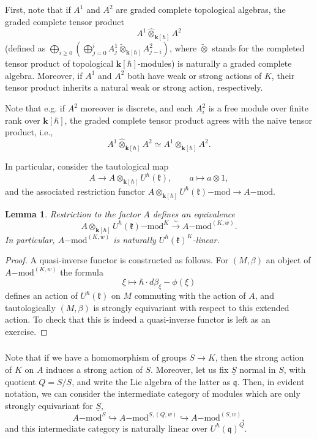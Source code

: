 \documentclass{amsart}
\newtheorem{Lem}[Thm]{Lemma}
\theoremstyle{definition}
\newcommand{\fk}{\mathfrak{k}}
\newcommand{\lmod}{\on{-mod}}
\newcommand{\sss}{\subsubsection{}}
\newcommand{\on}{\mathrm}
\newcommand{\bk}{\mathbf{k}}
\numberwithin{equation}{section}
\begin{document}
{ First, note that if $A^1$ and $A^2$ are graded complete topological algebras,  the graded complete tensor product $$A^1 \widehat{\otimes}_{\bk[\hbar]} A^2$$
(defined as $\bigoplus_{i\geqslant 0}(\bigoplus_{j=0}^i A^1_j\widetilde{\otimes}_{\bk[\hbar]}A^2_{j-i})$, where $\widetilde{\otimes}$ stands for the completed tensor product of topological $\bk[\hbar]$-modules)
is naturally a graded complete algebra. Moreover, if $A^1$ and $A^2$ both have weak or strong actions of $K$, their tensor product inherits a natural weak or strong action, respectively. 


Note that e.g. if $A^2$ moreover is discrete, and each $A^2_i$ is a free module over finite rank over $\bk[\hbar]$, the graded complete tensor product agrees with the naive tensor product, i.e., 
$$ A^1 \widehat{\otimes}_{\bk[\hbar]} A^2 \simeq A^1 \otimes_{\bk[\hbar]} A^2.$$ 
}

In particular, consider the tautological map $$A \rightarrow A  \otimes_{\bk[\hbar]} U^{\hbar}(\fk), \quad \quad a \mapsto a \otimes 1,$$
and the associated restriction functor $A \otimes_{\bk[\hbar]} U^\hbar(\fk) \lmod \rightarrow A\lmod.$

\begin{Lem}\label{l:bigbird} Restriction to the factor $A$ defines an equivalence
$$A \otimes_{\bk[\hbar]} U^\hbar(\fk) \lmod^K \xrightarrow{\sim} A\lmod^{(K,w)}.$$
In particular, $A\lmod^{(K,w)}$ is naturally $U^{\hbar}(\fk)^K$-linear. 
\end{Lem}

\begin{proof} A quasi-inverse functor is constructed as follows. For $(M, \beta)$ an object of $A\lmod^{(K,w)}$ the formula 
$$\xi \mapsto  \hbar \cdot d\beta_\xi - \phi(\xi)$$
defines an action of $U^{\hbar}(\fk)$ on $M$ commuting with the action of $A$, and tautologically $(M, \beta)$ is strongly equivariant with respect to this extended action. To check that this is indeed a quasi-inverse functor is left as an exercise.     
\end{proof}






\sss\label{SSS_subgroup_equivariance} 
Note that if we have a homomorphism of groups $S \rightarrow K$, then the strong action of $K$ on $A$ induces a strong action of $S$. Moreover, let us fix $\underline{S}$ normal in $S$, with quotient $Q = S/\underline{S}$, and write the Lie algebra of the latter as $\mathfrak{q}$. Then, in evident notation, we can consider the intermediate category of modules which are only strongly equivariant for $\underline{S}$, 
$$A\lmod^S \hookrightarrow A\lmod^{\underline{S}, (Q,w)} \hookrightarrow A\lmod^{(S,w)},$$
and this intermediate category is naturally linear over $U^{\hbar}(\mathfrak{q})^{Q}$. 
\end{document}
